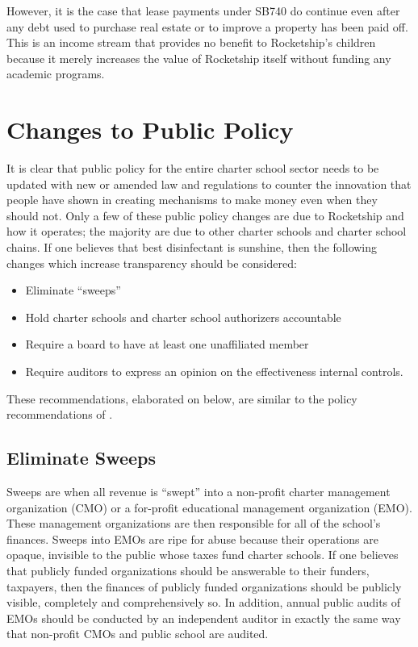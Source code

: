 However, it is the case that lease payments under SB740 do continue even after any debt used to purchase real estate or to improve a property has been paid off. This is an income stream that provides no benefit to Rocketship's children because it merely increases the value of Rocketship itself without funding any academic programs.

\section{Changes to Public Policy}%
\label{sec:chang-publ-policy}\indent

It is clear that public policy for the entire charter school sector needs to be updated with new or amended law and regulations to counter the innovation that people have shown in creating mechanisms to make money even when they should not. Only a few of these public policy changes are due to Rocketship and how it operates; the majority are due to other charter schools and charter school chains. If one believes that best disinfectant is sunshine, then the following changes which increase transparency should be considered:
\begin{itemize}
  \item Eliminate ``sweeps''
  \item Hold charter schools and charter school authorizers accountable
  \item Require a board to have at least one unaffiliated member
  \item Require auditors to express an opinion on the effectiveness internal controls.
\end{itemize}
These recommendations, elaborated on below, are similar to the policy recommendations of \textcite[44–46]{Baker.Miron2015}.

\subsection{Eliminate Sweeps}%
\label{sec:eliminate-sweeps}\indent

Sweeps are when all revenue is ``swept'' into a non-profit charter management organization (CMO) or a for-profit educational management organization (EMO). These management organizations are then responsible for all of the school's finances. Sweeps into EMOs are ripe for abuse because their operations are opaque, invisible to the public whose taxes fund charter schools. If one believes that publicly funded organizations should be answerable to their funders, taxpayers, then the finances of publicly funded organizations should be publicly visible, completely and comprehensively so. In addition, annual public audits of EMOs should be conducted by an independent auditor in exactly the same way that non-profit CMOs and public school are audited.

